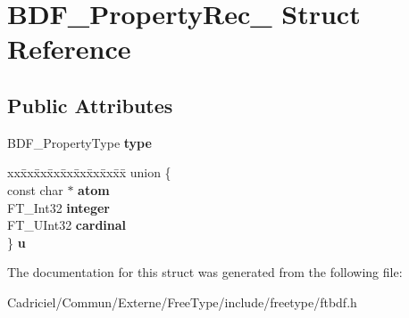 \hypertarget{struct_b_d_f___property_rec__}{}\section{B\+D\+F\+\_\+\+Property\+Rec\+\_\+ Struct Reference}
\label{struct_b_d_f___property_rec__}
\subsection*{Public Attributes}
\begin{DoxyCompactItemize}
\item 
B\+D\+F\+\_\+\+Property\+Type {\bfseries type}\hypertarget{struct_b_d_f___property_rec___a88c19ee6f16bd1b36127f5f7d44a4e39}{}\label{struct_b_d_f___property_rec___a88c19ee6f16bd1b36127f5f7d44a4e39}

\item 
\begin{tabbing}
xx\=xx\=xx\=xx\=xx\=xx\=xx\=xx\=xx\=\kill
union \{\\
\>const char $\ast$ {\bfseries atom}\\
\>FT\_Int32 {\bfseries integer}\\
\>FT\_UInt32 {\bfseries cardinal}\\
\} {\bfseries u}\hypertarget{struct_b_d_f___property_rec___ad0b90c890b8517d70b0f21a063840fe4}{}\label{struct_b_d_f___property_rec___ad0b90c890b8517d70b0f21a063840fe4}
\\

\end{tabbing}\end{DoxyCompactItemize}


The documentation for this struct was generated from the following file\+:\begin{DoxyCompactItemize}
\item 
Cadriciel/\+Commun/\+Externe/\+Free\+Type/include/freetype/ftbdf.\+h\end{DoxyCompactItemize}
